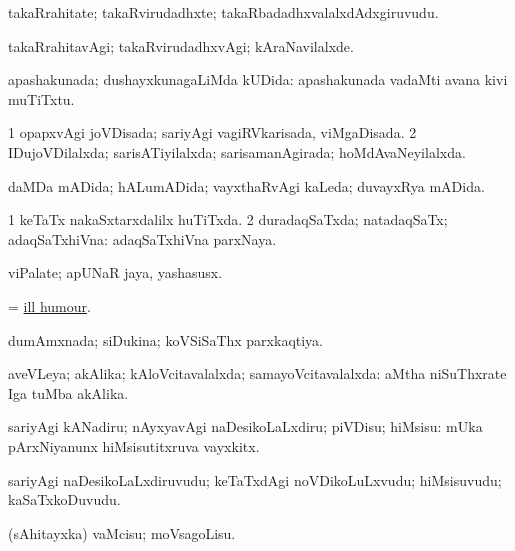 \bentry
{}
\gl{\nA}
\bmng
takaRrahitate; takaRvirudadhxte; takaRbadadhxvalalxdAdxgiruvudu. 
\emng
\eentry

\bentry
{}
\gl{\kirxvi}
\bmng
takaRrahitavAgi; takaRvirudadhxvAgi; kAraNavilalxde. 
\emng
\eentry

\bentry
{}
\gl{\gu}
\bmng
apashakunada; dushayxkunagaLiMda kUDida:  apashakunada vadaMti avana kivi muTiTxtu. 
\emng
\eentry

\bentry
{}
\gl{\gu}
\bmng
\bnum
\num{1} opapxvAgi joVDisada; sariyAgi vagiRVkarisada, viMgaDisada. 
\num{2} IDujoVDilalxda; sarisATiyilalxda; sarisamanAgirada; hoMdAvaNeyilalxda. 
\enum
\emng
\eentry

\bentry
{}
\gl{\gu}
\bmng
daMDa mADida; hALumADida; vayxthaRvAgi kaLeda; duvayxRya mADida. 
\emng
\eentry

\bentry
{}
\gl{\gu}
\bmng
\bnum
\num{1} keTaTx nakaSxtarxdalilx huTiTxda. 
\num{2} duradaqSaTxda; natadaqSaTx; adaqSaTxhiVna:  adaqSaTxhiVna parxNaya. 
\enum
\emng
\eentry

\bentry
{}
\gl{\nA}
\bmng
viPalate; apUNaR jaya, yashasusx. 
\emng
\eentry

\bentry
{}
\gl{\nA}
\bmng
 = \hyperlink{ill humour}{ill humour}. 
\emng
\eentry

\bentry
{}
\gl{\gu}
\bmng
dumAmxnada; siDukina; koVSiSaThx parxkaqtiya. 
\emng
\eentry

\bentry
{}
\gl{\gu}
\bmng
aveVLeya; akAlika; kAloVcitavalalxda; samayoVcitavalalxda:  aMtha niSuThxrate Iga tuMba akAlika. 
\emng
\eentry

\bentry
{}
\gl{\sakirx}
\bmng
sariyAgi kANadiru; nAyxyavAgi naDesikoLaLxdiru; piVDisu; hiMsisu:  mUka pArxNiyanunx hiMsisutitxruva vayxkitx. 
\emng
\eentry

\bentry
{}
\gl{\nA}
\bmng
sariyAgi naDesikoLaLxdiruvudu; keTaTxdAgi noVDikoLuLxvudu; hiMsisuvudu; kaSaTxkoDuvudu. 
\emng
\eentry

\bentry
{}
\gl{\sakirx}
\bmng
(sAhitayxka) vaMcisu; moVsagoLisu. 
\emng
\eentry

